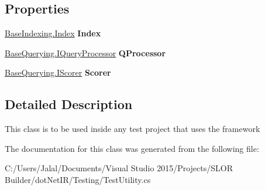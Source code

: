 \subsection*{Properties}
\begin{DoxyCompactItemize}
\item 
\hypertarget{classdot_net_i_r_1_1_testing_1_1_test_utility_a0e022e85dcf5337703b8312502195d42}{}\label{classdot_net_i_r_1_1_testing_1_1_test_utility_a0e022e85dcf5337703b8312502195d42} 
\hyperlink{classdot_net_i_r_1_1_base_indexing_1_1_index}{Base\+Indexing.\+Index} {\bfseries Index}
\item 
\hypertarget{classdot_net_i_r_1_1_testing_1_1_test_utility_a65404f97f52dffcaeb2c5d29e76a07fc}{}\label{classdot_net_i_r_1_1_testing_1_1_test_utility_a65404f97f52dffcaeb2c5d29e76a07fc} 
\hyperlink{interfacedot_net_i_r_1_1_base_querying_1_1_i_query_processor}{Base\+Querying.\+I\+Query\+Processor} {\bfseries Q\+Processor}
\item 
\hypertarget{classdot_net_i_r_1_1_testing_1_1_test_utility_a89458d4572650a5c683a14d1c94ee5b2}{}\label{classdot_net_i_r_1_1_testing_1_1_test_utility_a89458d4572650a5c683a14d1c94ee5b2} 
\hyperlink{interfacedot_net_i_r_1_1_base_querying_1_1_i_scorer}{Base\+Querying.\+I\+Scorer} {\bfseries Scorer}
\end{DoxyCompactItemize}


\subsection{Detailed Description}
This class is to be used inside any test project that uses the framework 



The documentation for this class was generated from the following file\+:\begin{DoxyCompactItemize}
\item 
C\+:/\+Users/\+Jalal/\+Documents/\+Visual Studio 2015/\+Projects/\+S\+L\+O\+R Builder/dot\+Net\+I\+R/\+Testing/Test\+Utility.\+cs\end{DoxyCompactItemize}
